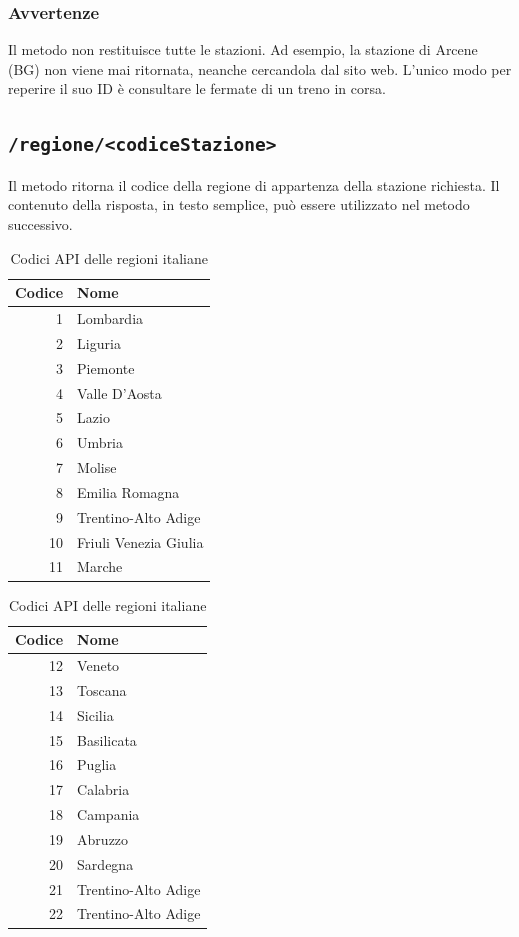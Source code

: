 \documentclass[12pt,italian]{report}
\begin{document}
\subsubsection{Avvertenze}

Il metodo non restituisce tutte le stazioni.  Ad esempio, la stazione
di Arcene (BG) non viene mai ritornata, neanche cercandola dal sito
web.  L'unico modo per reperire il suo ID è consultare le fermate di
un treno in corsa.

\subsection{\texttt{/regione/<codiceStazione>}}

Il metodo ritorna il codice della regione di appartenza della stazione
richiesta.  Il contenuto della risposta, in testo semplice, può essere
utilizzato nel metodo successivo.

\begin{table}[h] \centering
    \begin{tabular}{r|l}
      Codice & Nome \\
      \hline
      1 & Lombardia \\
      2 & Liguria \\
      3 & Piemonte \\
      4 & Valle D'Aosta \\
      5 & Lazio \\
      6 & Umbria \\
      7 & Molise \\
      8 & Emilia Romagna \\
      9 & Trentino-Alto Adige \\
      10 & Friuli Venezia Giulia \\
      11 & Marche \\
    \end{tabular}
    \begin{tabular}{r|l}
      Codice & Nome \\
      \hline
      12 & Veneto \\
      13 & Toscana \\
      14 & Sicilia \\
      15 & Basilicata \\
      16 & Puglia \\
      17 & Calabria \\
      18 & Campania \\
      19 & Abruzzo \\
      20 & Sardegna \\
      21 & Trentino-Alto Adige \\
      22 & Trentino-Alto Adige
    \end{tabular}
    \caption{Codici API delle regioni italiane}
    \label{regioni}
\end{table}
\end{document}
